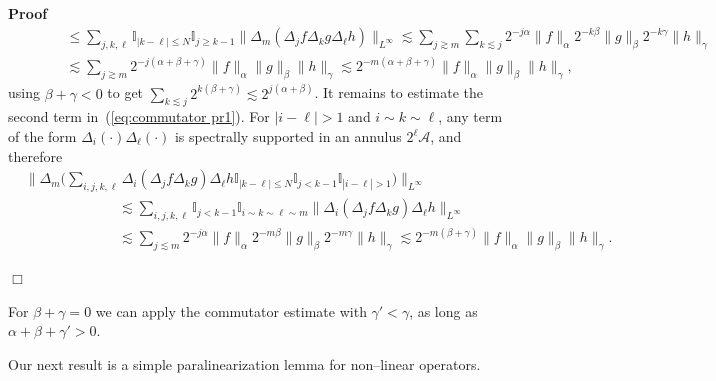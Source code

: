 \documentclass[a4paper,11pt]{article}
\newenvironment{proof}{\noindent\textbf{Proof\ }}{\hspace*{\fill}$\Box$\medskip}
\newcommand{\CA}{\mathscr{A}}
\begin{document}
\begin{proof}
\begin{align*}
     &\hspace{35pt} \leqslant \sum_{j, k, \ell} \mathbb{I}_{| k - \ell | \leqslant N} \mathbb{I}_{j \geqslant k - 1} \| \Delta_m (\Delta_j f \Delta_k g \Delta_{\ell} h) \|_{L^{\infty}} \lesssim \sum_{j \gtrsim m} \sum_{k \lesssim j} 2^{- j \alpha} \| f \|_{\alpha} 2^{- k \beta} \| g \|_{\beta} 2^{- k \gamma} \| h \|_{\gamma} \\
     &\hspace{35pt} \lesssim \sum_{j \gtrsim m} 2^{- j (\alpha + \beta + \gamma)} \| f \|_{\alpha} \| g \|_{\beta} \| h \|_{\gamma} \lesssim 2^{- m (\alpha +  \beta + \gamma)} \| f \|_{\alpha} \| g \|_{\beta} \| h \|_{\gamma},
  \end{align*}
  using $\beta + \gamma < 0$ to get $\sum_{k\lesssim j}2^{k(\beta+\gamma)} \lesssim 2^{j(\alpha+\beta)}$. It remains to estimate the second term
  in~(\ref{eq:commutator pr1}). For $| i - \ell | > 1$ and $i \sim k \sim
  \ell$, any term of the form $\Delta_i (\cdot) \Delta_{\ell} (\cdot)$ is spectrally
  supported in an annulus $2^{\ell} \CA$, and therefore
  \begin{align*}
      & \Big\| \Delta_m \Big( \sum_{i, j, k, \ell} \Delta_i  (\Delta_j f \Delta_k g) \Delta_{\ell} h \mathbb{I}_{| k - \ell | \leqslant N} \mathbb{I}_{j < k - 1} \mathbb{I}_{| i - \ell | > 1} \Big) \Big\|_{L^{\infty}} \\
      &\hspace{80pt} \lesssim \sum_{i, j, k, \ell} \mathbb{I}_{j < k - 1} \mathbb{I}_{i \sim k \sim \ell \sim m} \|\Delta_i  (\Delta_j f \Delta_k g) \Delta_{\ell} h \|_{L^{\infty}} \\
      &\hspace{80pt} \lesssim \sum_{j \lesssim m} 2^{- j \alpha} \| f \|_{\alpha} 2^{- m \beta} \| g \|_{\beta} 2^{- m \gamma} \| h \|_{\gamma} \lesssim 2^{- m(\beta + \gamma)} \| f \|_{\alpha} \| g \|_{\beta} \| h \|_{\gamma}.
  \end{align*}
  
\end{proof}

\begin{remark}
  For $\beta + \gamma = 0$ we can apply the commutator estimate with $\gamma'
  < \gamma$, as long as $\alpha + \beta + \gamma' > 0$.
\end{remark}

Our next result is a simple paralinearization lemma for non--linear operators.
\end{document}
